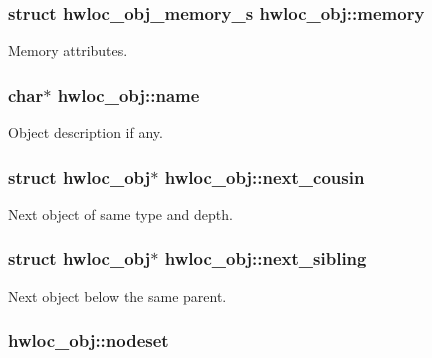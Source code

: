 \hypertarget{a00016_a1dc830816716213b5f797e4052487864}{
\subsubsection[{memory}]{\setlength{\rightskip}{0pt plus 5cm}struct {\bf hwloc\_\-obj\_\-memory\_\-s} {\bf hwloc\_\-obj::memory}}}
\label{a00016_a1dc830816716213b5f797e4052487864}


Memory attributes. 

\hypertarget{a00016_abb709ec38f2970677e4e57d1d30be96d}{
\subsubsection[{name}]{\setlength{\rightskip}{0pt plus 5cm}char$\ast$ {\bf hwloc\_\-obj::name}}}
\label{a00016_abb709ec38f2970677e4e57d1d30be96d}


Object description if any. 

\hypertarget{a00016_a85a788017457129589318b6c39451acf}{
\subsubsection[{next\_\-cousin}]{\setlength{\rightskip}{0pt plus 5cm}struct {\bf hwloc\_\-obj}$\ast$ {\bf hwloc\_\-obj::next\_\-cousin}}}
\label{a00016_a85a788017457129589318b6c39451acf}


Next object of same type and depth. 

\hypertarget{a00016_a7f2343ed476fe4942e6fffd4cade1b40}{
\subsubsection[{next\_\-sibling}]{\setlength{\rightskip}{0pt plus 5cm}struct {\bf hwloc\_\-obj}$\ast$ {\bf hwloc\_\-obj::next\_\-sibling}}}
\label{a00016_a7f2343ed476fe4942e6fffd4cade1b40}


Next object below the same parent. 

\hypertarget{a00016_a08f0d0e16c619a6e653526cbee4ffea3}{
\subsubsection[{nodeset}]{ {\bf hwloc\_\-obj::nodeset}}}
\label{a00016_a08f0d0e16c619a6e653526cbee4ffea3}


